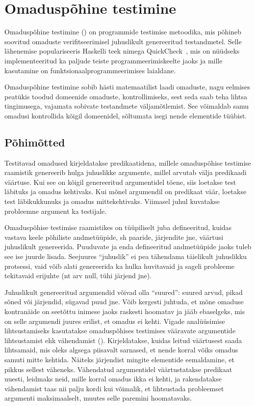 \documentclass[../thesis.tex]{subfiles}
\begin{document}
\section{Omaduspõhine testimine}
Omaduspõhine testimine () on programmide testimise metoodika, mis põhineb soovitud omaduste verifitseerimisel juhuslikult genereeritud testandmetel. Selle lähenemise populariseeris Haskelli teek nimega QuickCheck~\cite{claessen_quickcheck}, mis on nüüdseks implementeeritud ka paljude teiste programmeerimiskeelte jaoks ja mille kasutamine on funktsionaalprogrammeerimises laialdane.

Omaduspõhine testimine sobib hästi matemaatilist laadi omaduste, nagu eelmises peatükis toodud domeenide omaduste, kontrollimiseks, sest seda saab teha lihtsa tingimusega, vajamata sobivate testandmete väljamõtlemist. See võimaldab samu omadusi kontrollida kõigil domeenidel, sõltumata isegi nende elementide tüübist.

\subsection{Põhimõtted}
Testitavad omadused kirjeldatakse predikaatidena, millele omaduspõhise testimise raamistik genereerib hulga juhuslikke argumente, millel arvutab välja predikaadi väärtuse. Kui see on kõigil genereeritud argumentidel tõene, siis loetakse test läbituks ja omadus kehtivaks. Kui mõnel argumendil on predikaat väär, loetakse test läbikukkunuks ja omadus mittekehtivaks. Viimasel juhul kuvatakse probleemne argument ka testijale.

Omaduspõhise testimise raamistikes on tüüpiliselt juba defineeritud, kuidas vastava keele põhiliste andmetüüpide, sh paaride, järjendite jne, väärtusi juhuslikult genereerida. Puuduvate ja enda defineeritud andmetüüpide jaoks tuleb see ise juurde lisada. Seejuures \enquote{juhuslik} ei pea tähendama täielikult juhuslikku protsessi, vaid võib alati genereerida ka hulka huvitavaid ja sageli probleeme tekitavaid erijuhte (nt arv null, tühi järjend jne).

Juhuslikult genereeritud argumendid võivad olla \enquote{suured}: suured arvud, pikad sõned või järjendid, sügavad puud jne. Võib kergesti juhtuda, et mõne omaduse kontranäide on seetõttu inimese jaoks raskesti hoomatav ja jääb ebaselgeks, mis on selle argumendi juures erilist, et omadus ei kehti. Vigade analüüsimise lihtsustamiseks kasutatakse omaduspõhises testimises vääravate argumentide lihtsustamist ehk vähendamist (). Kirjeldatakse, kuidas leitud väärtusest saada lihtsamaid, mis oleks algsega piisavalt sarnased, et nende korral võiks omadus samuti mitte kehtida. Näiteks järjendist mingite elementide eemaldamine, et pikkus sellest väheneks. Vähendatud argumentidel väärtustatakse predikaat uuesti, leidmaks neid, mille korral omadus ikka ei kehti, ja rakendatakse vähendamist taas nii palju kordi kui võimalik, et lihtsustada probleemset argumenti maksimaalselt, muutes selle paremini hoomatavaks.
\end{document}
